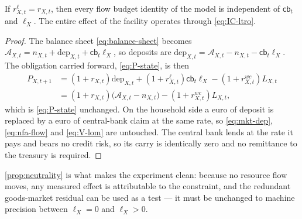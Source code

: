 \begin{proposition}
\label{prop:neutrality}
If $r^{\ell}_{X,t}=r_{X,t}$, then every flow budget identity of the model is
independent of $\mathsf{cb}_t$ and $\ell_X$. The entire effect of the facility
operates through \eqref{eq:IC-ltro}.
\end{proposition}
\begin{proof}
The balance sheet \eqref{eq:balance-sheet} becomes
$\mathcal{A}_{X,t}=n_{X,t}+\mathrm{dep}_{X,t}+\mathsf{cb}_t\ell_X$, so deposits are
$\mathrm{dep}_{X,t}=\mathcal{A}_{X,t}-n_{X,t}-\mathsf{cb}_t\ell_X$. The obligation
carried forward, \eqref{eq:P-state}, is then
\begin{align*}
P_{X,t+1}&=(1+r_{X,t})\mathrm{dep}_{X,t}
          +(1+r^{\ell}_{X,t})\mathsf{cb}_t\ell_X
          -(1+r^{wc}_{X,t})L_{X,t}\\
        &=(1+r_{X,t})\bigl(\mathcal{A}_{X,t}-n_{X,t}\bigr)
          -(1+r^{wc}_{X,t})L_{X,t},
\end{align*}
which is \eqref{eq:P-state} unchanged. On the household side a euro of deposit is
replaced by a euro of central-bank claim at the same rate, so
\eqref{eq:mkt-dep}, \eqref{eq:nfa-flow} and \eqref{eq:V-lom} are untouched. The
central bank lends at the rate it pays and bears no credit risk, so its carry is
identically zero and no remittance to the treasury is required.
\end{proof}

\cref{prop:neutrality} is what makes the experiment clean: because no resource
flow moves, any measured effect is attributable to the constraint, and the
redundant goods-market residual can be used as a test --- it must be unchanged to
machine precision between $\ell_X=0$ and $\ell_X>0$.

